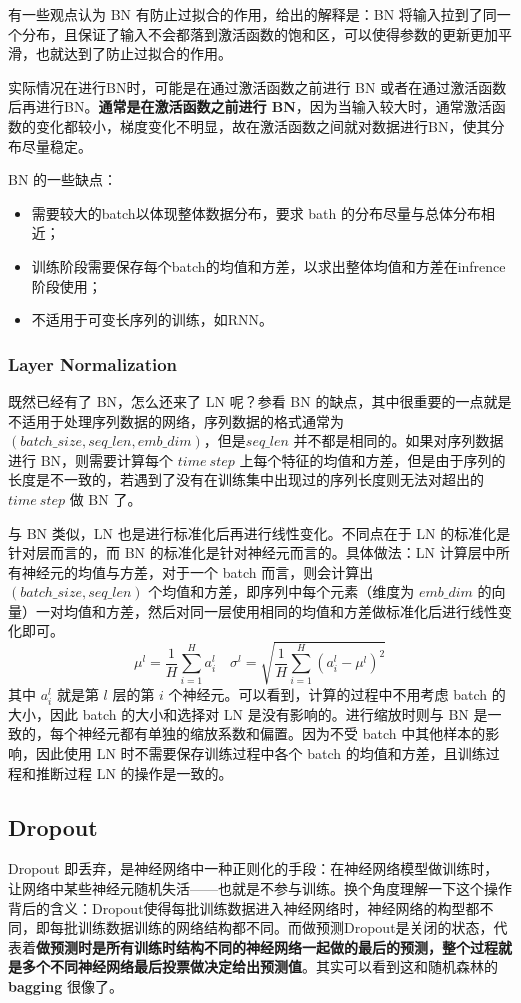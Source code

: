 有一些观点认为 BN 有防止过拟合的作用，给出的解释是：BN 将输入拉到了同一个分布，且保证了输入不会都落到激活函数的饱和区，可以使得参数的更新更加平滑，也就达到了防止过拟合的作用。


实际情况在进行BN时，可能是在通过激活函数之前进行 BN 或者在通过激活函数后再进行BN。\textbf{通常是在激活函数之前进行 BN}，因为当输入较大时，通常激活函数的变化都较小，梯度变化不明显，故在激活函数之间就对数据进行BN，使其分布尽量稳定。

BN 的一些缺点：
\begin{itemize}
	\item 需要较大的batch以体现整体数据分布，要求 bath 的分布尽量与总体分布相近；
	\item 训练阶段需要保存每个batch的均值和方差，以求出整体均值和方差在infrence阶段使用；
	\item 不适用于可变长序列的训练，如RNN。
\end{itemize}

\subsubsection{Layer Normalization}
既然已经有了 BN，怎么还来了 LN 呢？参看 BN 的缺点，其中很重要的一点就是不适用于处理序列数据的网络，序列数据的格式通常为 $(batch\_size, seq\_len, emb\_dim)$，但是$seq\_len$ 并不都是相同的。如果对序列数据进行 BN，则需要计算每个 $time\ step$ 上每个特征的均值和方差，但是由于序列的长度是不一致的，若遇到了没有在训练集中出现过的序列长度则无法对超出的 $time\ step$ 做 BN 了。

与 BN 类似，LN 也是进行标准化后再进行线性变化。不同点在于 LN 的标准化是针对层而言的，而 BN 的标准化是针对神经元而言的。具体做法：LN 计算层中所有神经元的均值与方差，对于一个 batch 而言，则会计算出 $(batch\_size, seq\_len)$ 个均值和方差，即序列中每个元素（维度为 $emb\_dim$ 的向量）一对均值和方差，然后对同一层使用相同的均值和方差做标准化后进行线性变化即可。
$$
\mu^{l}=\frac{1}{H} \sum_{i=1}^{H} a_{i}^{l} \quad \sigma^{l}=\sqrt{\frac{1}{H} \sum_{i=1}^{H}\left(a_{i}^{l}-\mu^{l}\right)^{2}}
$$
其中 $a_i^l$ 就是第 $l$ 层的第 $i$ 个神经元。可以看到，计算的过程中不用考虑 batch 的大小，因此 batch 的大小和选择对 LN 是没有影响的。进行缩放时则与 BN 是一致的，每个神经元都有单独的缩放系数和偏置。因为不受 batch 中其他样本的影响，因此使用 LN 时不需要保存训练过程中各个 batch 的均值和方差，且训练过程和推断过程 LN 的操作是一致的。

\subsection{Dropout}
Dropout 即丢弃，是神经网络中一种正则化的手段：在神经网络模型做训练时，让网络中某些神经元随机失活——也就是不参与训练。换个角度理解一下这个操作背后的含义：Dropout使得每批训练数据进入神经网络时，神经网络的构型都不同，即每批训练数据训练的网络结构都不同。而做预测Dropout是关闭的状态，代表着\textbf{做预测时是所有训练时结构不同的神经网络一起做的最后的预测，整个过程就是多个不同神经网络最后投票做决定给出预测值}。其实可以看到这和随机森林的 \textbf{bagging} 很像了。

